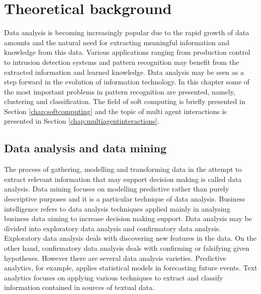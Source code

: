 \chapter{Theoretical background}
\label{chap:dataanalysis}

Data analysis is becoming increasingly popular due to the rapid growth of data amounts and the natural need for extracting meaningful information and knowledge from this data. 
Various applications ranging from production control to intrusion detection systems and pattern recognition may benefit from the extracted information and learned knowledge. 
Data analysis may be seen as a step forward in the evolution of information technology. In this chapter some of the most important problems in pattern recognition are presented, namely, clustering and classification. The field of soft computing is  briefly presented in Section \ref{chap:softcomputing} and the topic of multi agent interactions is presented in Section \ref{chap:multiagentinteractions}.

\section{Data analysis and data mining}

The process of gathering, modelling and transforming data in the attempt to extract relevant information that may support decision making is called data analysis. Data mining focuses on modelling predictive rather than purely descriptive purposes and it is a particular technique of data analysis. 
Business intelligence refers to data analysis techniques applied mainly in analysing business data aiming to increase decision making support. Data analysis may be divided into exploratory data analysis and confirmatory data analysis. Exploratory data analysis deals with discovering new features in the data. On the other hand, confirmatory data analysis  deals with confirming or falsifying given hypotheses. However there are several data analysis varieties. Predictive analytics, for example, applies statistical models in forecasting future events. Text analytics focuses on applying various techniques to extract and classify information contained in sources of textual data.

